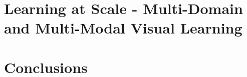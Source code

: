 \documentclass[phd,tocprelim]{cornell}
\begin{document}
\chapter{Learning at Scale - Multi-Domain and Multi-Modal Visual Learning}
\label{repr}
%


\chapter{Conclusions}
\label{conc}
%

\appendix



\end{document}
